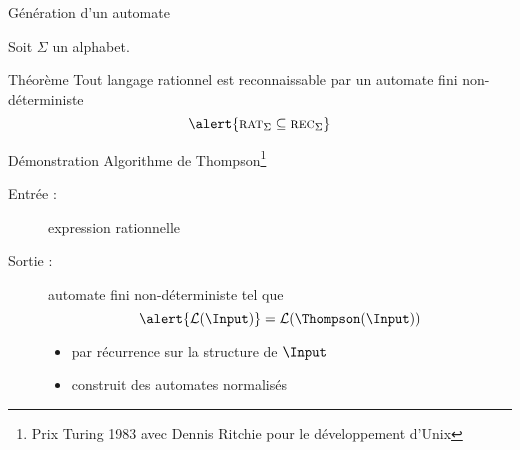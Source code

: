 
\begingroup


\begin{frame}{Génération d'un automate}
  
  Soit $\Sigma$ un alphabet.

  \begin{minipage}{8cm}
    \begin{block}{Théorème}
      Tout langage rationnel
      est reconnaissable par un automate fini non-déterministe
      $$ \alert{\textsc{rat}_\Sigma \subseteq  \textsc{rec}_\Sigma} $$
    \end{block}
  \end{minipage}
  \begin{block}{Démonstration}
    Algorithme de Thompson\footnote[frame]{Prix Turing 1983 avec Dennis Ritchie pour le développement d'Unix}
    \begin{description}
    \item [Entrée :] expression rationnelle 
    \item [Sortie :] automate fini non-déterministe \structure{$\Thompson(\Input)$} tel que
      $$\alert{\mathcal{L}(\Input)} = \mathcal{L}(\Thompson(\Input))$$
      \vspace{-5mm}
      \begin{itemize}
      \item par récurrence sur la structure de $\Input$
      \item construit des automates \alert{normalisés}
      \end{itemize}
    \end{description}
  \end{block}

\end{frame}

\endgroup
